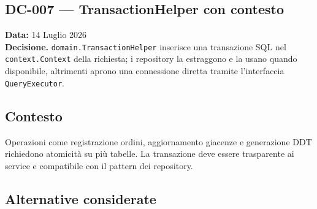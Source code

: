 \documentclass[a4paper,12pt]{article}
\begin{document}
\newpage
\begin{decisionbox}
\section*{DC-007 --- TransactionHelper con contesto}
\textbf{Data:} 14 Luglio 2026\\
\textbf{Decisione.} \texttt{domain.TransactionHelper} inserisce una transazione SQL nel \texttt{context.Context} della richiesta; i repository la estraggono e la usano quando disponibile, altrimenti aprono una connessione diretta tramite l'interfaccia \\ \texttt{QueryExecutor}.
\end{decisionbox}

\subsection*{Contesto}
Operazioni come registrazione ordini, aggiornamento giacenze e generazione DDT richiedono atomicit\`{a} su pi\`{u} tabelle. La transazione deve essere trasparente ai service e compatibile con il pattern dei repository.


\subsection*{Alternative considerate}
\end{document}
